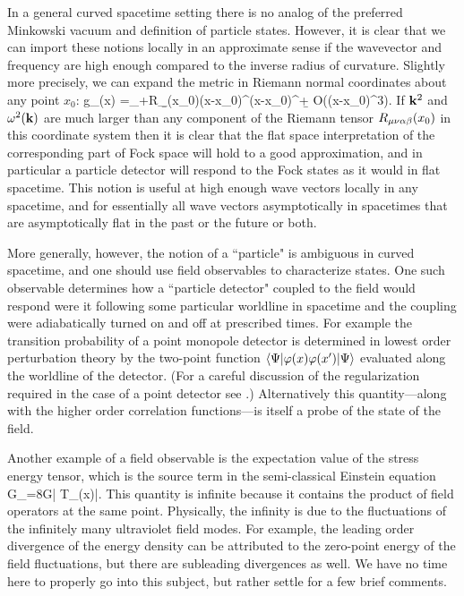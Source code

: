 \documentclass[12pt]{article}
\begin{document}
In a general curved spacetime setting there is no analog of
the preferred Minkowski vacuum and definition of particle
states. However, it is clear that we can import these notions
locally in an approximate sense if the wavevector and frequency
are high enough compared to the inverse radius of curvature.
Slightly more precisely, we can expand the metric in Riemann
normal coordinates about any point $x_0$:
%
\beq g_{\m\n}(x)
=\eta_{\m\n}+R_{\m\n\a\b}(x_0)(x-x_0)^\a(x-x_0)^\b +
O((x-x_0)^3).\eeq
%
If ${\bf k}^2$ and $\omega^2({\bf k})$ are much larger than any
component of the Riemann tensor $R_{\mu\nu\alpha\beta}(x_0)$ in this
coordinate system then it is clear that the flat space
interpretation of the corresponding part of 
Fock space will hold to a good
approximation, and in particular a particle detector will
respond to the Fock states as it would in flat spacetime. This
notion is useful at high enough wave vectors locally in any
spacetime, and for essentially all wave vectors asymptotically
in spacetimes that are asymptotically flat in the past or the
future or both.

More generally, however, the notion of a ``particle" is
ambiguous in curved spacetime, and one should use field
observables to characterize states. One such observable 
determines how a ``particle detector" coupled to the field would
respond were it following some particular worldline in
spacetime and the coupling were adiabatically turned on and off
at prescribed times. For example the transition probability 
of a point monopole 
detector is determined in lowest order perturbation theory by
the two-point function $\langle\Psi|\varphi(x)\varphi(x')|\Psi\rangle$ evaluated
along the worldline\cite{Unruh:ga,DeWittEC} 
of the detector. 
(For a careful discussion of the regularization required
in the case of a point detector see \cite{Schlicht:2003iy}.)
Alternatively this quantity---along with the higher order correlation
functions---is itself a probe of the state of the field. 

Another example of a field observable is the 
expectation value of the stress energy
tensor, which is the source term in the semi-classical Einstein
equation
\beq
G_{\m\n}=8\pi G\la\Psi| T_{\m\n}(x)|\Psi\ra.
\label{scee}
\eeq
This quantity is infinite
because it contains the product of field operators
at the same point.
Physically, the infinity is due to
the fluctuations of the infinitely many ultraviolet field modes.
For example, the leading order divergence of the energy
density can be 
attributed to the zero-point energy of the field fluctuations,
but there are subleading divergences as well.
We have no time here to properly go into this subject,
but rather settle for a few brief comments.
\end{document}
